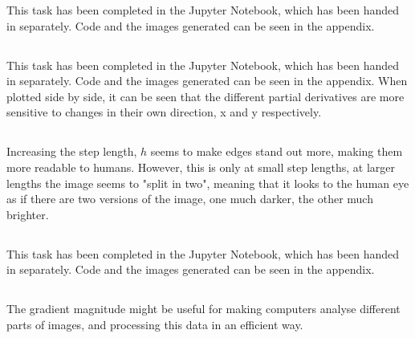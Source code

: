 This task has been completed in the Jupyter Notebook, which has been handed in separately. Code and the images generated can be seen in the appendix.
\subsection{}
This task has been completed in the Jupyter Notebook, which has been handed in separately. Code and the images generated can be seen in the appendix. When plotted side by side, it can be seen that the different partial derivatives are more sensitive to changes in their own direction, x and y respectively.
\subsection{}
Increasing the step length, $h$ seems to make edges stand out more, making them more readable to humans. However, this is only at small step lengths, at larger lengths the image seems to "split in two", meaning that it looks to the human eye as if there are two versions of the image, one much darker, the other much brighter.
\subsection{}
This task has been completed in the Jupyter Notebook, which has been handed in separately. Code and the images generated can be seen in the appendix.
\subsection{}
The gradient magnitude might be useful for making computers analyse different parts of images, and processing this data in an efficient way.